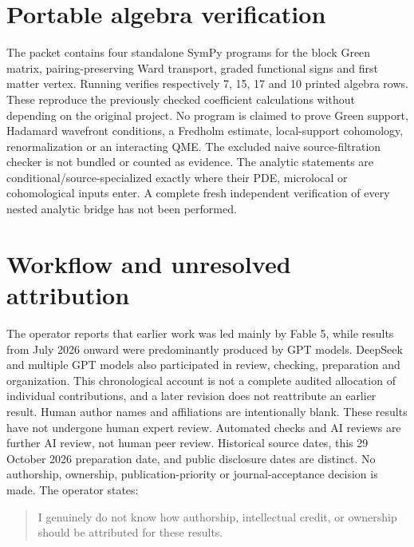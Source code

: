 \documentclass[11pt]{article}
\theoremstyle{definition}
\theoremstyle{remark}
\begin{document}
\section{Portable algebra verification}
The packet contains four standalone SymPy programs for the block Green matrix,
pairing-preserving Ward transport, graded functional signs and first matter
vertex. Running  verifies respectively 7, 15, 17 and
10 printed algebra rows. These reproduce the previously checked coefficient
calculations without depending on the original project. No program is claimed
to prove Green support, Hadamard wavefront conditions, a Fredholm estimate,
local-support cohomology, renormalization or an interacting QME. The excluded
naive source-filtration checker is not bundled or counted as evidence.
The analytic statements are conditional/source-specialized exactly where their
PDE, microlocal or cohomological inputs enter. A complete fresh independent
verification of every nested analytic bridge has not been performed.

\section*{Workflow and unresolved attribution}
The operator reports that earlier work was led mainly by Fable 5, while results
from July 2026 onward were predominantly produced by GPT models. DeepSeek and
multiple GPT models also participated in review, checking, preparation and
organization. This chronological account is not a complete audited allocation
of individual contributions, and a later revision does not reattribute an earlier
result. Human author names and affiliations are intentionally blank. These
results have not undergone human expert review. Automated checks and AI reviews
are further AI review, not human peer review. Historical source dates, this
29 October 2026 preparation date, and public disclosure dates are distinct.
No authorship, ownership, publication-priority or journal-acceptance decision is
made. The operator states:
\begin{quote}
I genuinely do not know how authorship, intellectual credit, or ownership should be attributed for these results.
\end{quote}



\end{document}
